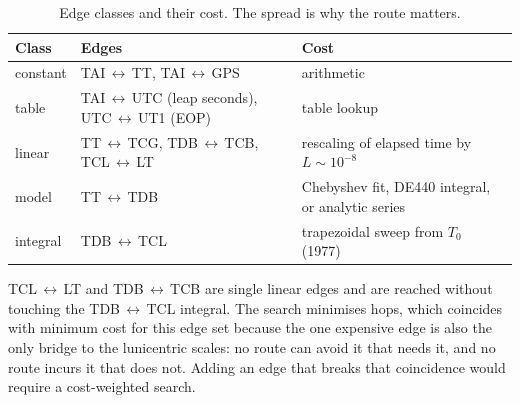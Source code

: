 \begin{table}[htbp]
  \centering
  \caption{Edge classes and their cost. The spread is why the route matters.}
  \label{tab:tc-edges}
  \begin{tabularx}{\textwidth}{llL}
    \toprule
    Class & Edges & Cost \\
    \midrule
    constant & TAI\,$\leftrightarrow$\,TT, TAI\,$\leftrightarrow$\,GPS & arithmetic \\
    table    & TAI\,$\leftrightarrow$\,UTC (leap seconds),
               UTC\,$\leftrightarrow$\,UT1 (EOP) & table lookup \\
    linear   & TT\,$\leftrightarrow$\,TCG, TDB\,$\leftrightarrow$\,TCB,
               TCL\,$\leftrightarrow$\,LT & rescaling of elapsed time by $L\sim10^{-8}$ \\
    model    & TT\,$\leftrightarrow$\,TDB & Chebyshev fit, DE440 integral, or analytic series \\
    integral & TDB\,$\leftrightarrow$\,TCL & trapezoidal sweep from $T_0$ (1977) \\
    \bottomrule
  \end{tabularx}
\end{table}

TCL\,$\leftrightarrow$\,LT and TDB\,$\leftrightarrow$\,TCB are single linear
edges and are reached without touching the TDB\,$\leftrightarrow$\,TCL
integral. The search minimises hops, which coincides with minimum cost for
this edge set because the one expensive edge is also the only bridge to the
lunicentric scales: no route can avoid it that needs it, and no route incurs it
that does not. Adding an edge that breaks that coincidence would require a
cost-weighted search.

